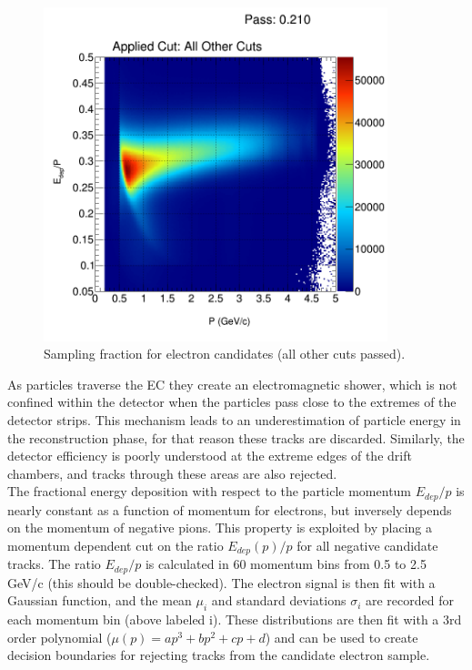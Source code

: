 \begin{figure}
  \label{fig:sampling_fraction}
  \begin{center}
    \includegraphics[width=10cm]{image/h_etot_p_allOthers_all.png}
    \caption{Sampling fraction for electron candidates (all other cuts passed).}
  \end{center}
\end{figure}

As particles traverse the EC they create an electromagnetic shower, which is not confined within the detector when the particles pass close to the extremes of the detector strips.  This mechanism leads to an underestimation of particle energy in the reconstruction phase, for that reason these tracks are discarded.  Similarly, the detector efficiency is poorly understood at the extreme edges of the drift chambers, and tracks through these areas are also rejected.  \\

The fractional energy deposition with respect to the particle momentum $E_{dep}/p$ is nearly constant as a function of momentum for electrons, but inversely depends on the momentum of negative pions.  This property is exploited by placing a momentum dependent cut on the ratio $E_{dep}(p)/p$ for all negative candidate tracks.  The ratio $E_{dep}/p$ is calculated in 60 momentum bins from 0.5 to 2.5 GeV/c (this should be double-checked).  The electron signal is then fit with a Gaussian function, and the mean $\mu_i$ and standard deviations $\sigma_i$ are recorded for each momentum bin (above labeled i).  These distributions are then fit with a 3rd order polynomial ($\mu(p) = ap^3 + bp^2 + cp + d$) and can be used to create decision boundaries for rejecting tracks from the candidate electron sample.  
\\

